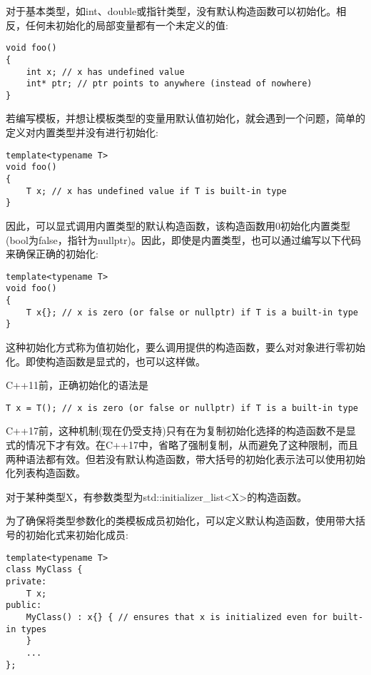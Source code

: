 对于基本类型，如int、double或指针类型，没有默认构造函数可以初始化。相反，任何未初始化的局部变量都有一个未定义的值:

\begin{lstlisting}[style=styleCXX]
void foo()
{
	int x; // x has undefined value
	int* ptr; // ptr points to anywhere (instead of nowhere)
}
\end{lstlisting}

若编写模板，并想让模板类型的变量用默认值初始化，就会遇到一个问题，简单的定义对内置类型并没有进行初始化:

\begin{lstlisting}[style=styleCXX]
template<typename T>
void foo()
{
	T x; // x has undefined value if T is built-in type
}
\end{lstlisting}

因此，可以显式调用内置类型的默认构造函数，该构造函数用0初始化内置类型(bool为false，指针为nullptr)。因此，即使是内置类型，也可以通过编写以下代码来确保正确的初始化:

\begin{lstlisting}[style=styleCXX]
template<typename T>
void foo()
{
	T x{}; // x is zero (or false or nullptr) if T is a built-in type
}
\end{lstlisting}

这种初始化方式称为值初始化，要么调用提供的构造函数，要么对对象进行零初始化。即使构造函数是显式的，也可以这样做。

C++11前，正确初始化的语法是

\begin{lstlisting}[style=styleCXX]
T x = T(); // x is zero (or false or nullptr) if T is a built-in type
\end{lstlisting}

C++17前，这种机制(现在仍受支持)只有在为复制初始化选择的构造函数不是显式的情况下才有效。在C++17中，省略了强制复制，从而避免了这种限制，而且两种语法都有效。但若没有默认构造函数，带大括号的初始化表示法可以使用初始化列表构造函数。

\begin{tcolorbox}[colback=webgreen!5!white,colframe=webgreen!75!black]
\hspace*{0.75cm}对于某种类型X，有参数类型为std::initializer\_list<X>的构造函数。
\end{tcolorbox}

为了确保将类型参数化的类模板成员初始化，可以定义默认构造函数，使用带大括号的初始化式来初始化成员:

\begin{lstlisting}[style=styleCXX]
template<typename T>
class MyClass {
private:
	T x;
public:
	MyClass() : x{} { // ensures that x is initialized even for built-in types
	}
	...
};
\end{lstlisting}


